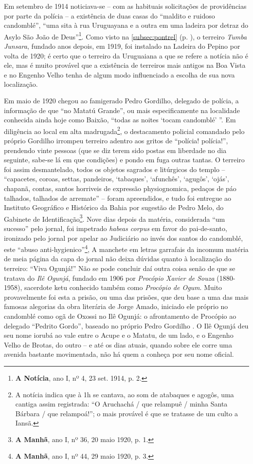 Em setembro de 1914 noticiava-se -- com as habituais solicitações de providências por parte da polícia -- a existência de duas casas do ``maldito e ruidoso candomblé'', ``uma sita à rua Uruguayana e a outra em uma ladeira por detraz do Asylo São João de Deus''\footnote{\textbf{A Notícia}, ano I, nº 4, 23 set. 1914, p. 2.}. Como visto na \autoref{subsec:pontrel} (p. \pageref{subsec:pontrel}), o terreiro \textit{Tumba Junsara}, fundado anos depois, em 1919, foi instalado na Ladeira do Pepino por volta de 1920; é certo que o terreiro da Uruguaiana a que se refere a notícia não é ele, mas é muito provável que a existência de terreiros mais antigos na Boa Vista e no Engenho Velho tenha de algum modo influenciado a escolha de sua nova localização.

Em maio de 1920 chegou ao famigerado Pedro Gordilho, delegado de polícia, a informação de que ``no Matatú Grande'', ou mais especificamente na localidade conhecida ainda hoje como Baixão, ``todas as noites `tocam candomblé' ''. Em diligência ao local em alta madrugada\footnote{A notícia indica que à 1h se cantava, ao som de atabaques e agogôs, uma cantiga assim registrada: ``O Aruchachá / que relampuê / minha Santa Bárbara / que relampoá!''; o mais provável é que se tratasse de um culto a Iansã.}, o destacamento policial comandado pelo próprio Gordilho irrompeu terreiro adentro aos gritos de ``polícia! polícia!'', prendendo vinte pessoas (que se diz terem sido postas em liberdade no dia seguinte, sabe-se lá em que condições) e pondo em fuga outras tantas. O terreiro foi assim desmantelado, todos os objetos sagrados e litúrgicos do templo -- ``capacetes, coroas, settas, pandeiros, `tabaques', `afunchês', `agugôs', `ojás', chapanã, contas, santos horriveis de expressão physiognomica, pedaços de páo talhados, talhados de arremate'' -- foram apreendidos, e tudo foi entregue ao Instituto Geográfico e Histórico da Bahia por sugestão de Pedro Melo, do Gabinete de Identificação\footnote{\textbf{A Manhã}, ano I, nº 36, 20 maio 1920, p. 1.}. Nove dias depois da matéria, considerada ``um sucesso'' pelo jornal, foi impetrado \textit{habeas corpus} em favor do pai-de-santo, ironizado pelo jornal por apelar ao Judiciário ao invés dos santos do candomblé, este ``abuso anti-hygienico''\footnote{\textbf{A Manhã}, ano I, nº 44, 29 maio 1920, p. 3.}, A manchete em letras garrafais da incomum matéria de meia página da capa do jornal não deixa dúvidas quanto à localização do terreiro: ``Viva Ogunjá!'' Não se pode concluir daí outra coisa senão de que se tratava do \textit{Ilê Ogunjá}, fundado em 1906 por \textit{Procópio Xavier de Souza} (1880-1958), sacerdote ketu conhecido também como \textit{Procópio de Ogum}. Muito provavelmente foi esta a prisão, ou uma das prisões, que deu base a uma das mais famosas alegorias da obra literária de Jorge Amado, iniciado ele próprio no candomblé como ogã de Oxossi no Ilê Ogunjá: o afrontamento de Procópio ao delegado ``Pedrito Gordo'', baseado no próprio Pedro Gordilho \cite[p.~236-242]{amado_tenda_2010}. O Ilê Ogunjá deu seu nome iorubá ao vale entre o Acupe e o Matatu, de um lado, e o Engenho Velho de Brotas, do outro -- e até os dias atuais, quando sobre ele corre uma avenida bastante movimentada, não há quem a conheça por seu nome oficial.

